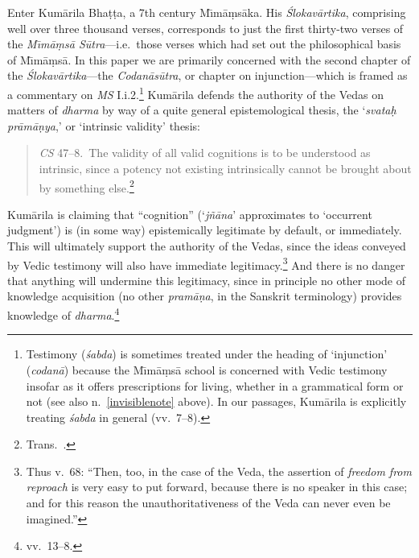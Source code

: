 \documentclass[11pt,letterpaper,oneside]{amsart}
\newcommand{\e}{\emph}
\newenvironment{squote}{\begin{quote}\sf\small}{\rm\end{quote}} %
\begin{document}
Enter Kum\=arila Bha\d t\d ta, a 7th century M\={\i}m\=a\d ms\=aka. His \emph{\small\'S\normalsize lokav\=artika}, comprising well over three thousand verses, corresponds to just the first thirty-two verses of the \emph{M\={\i}m\=a\d ms\=a S\=utra}---i.e.\ those verses which had set out the philosophical basis of M\={\i}m\=a\d ms\=a. In this paper we are primarily concerned with the second chapter of the \emph{\small\'S\normalsize lokav\=artika}---the \emph{Codan\=as\=utra}, or chapter on injunction---which is framed as a commentary on \emph{MS} I.i.2.\footnote{Testimony (\emph{\'sabda}) is sometimes treated under the heading of `injunction' (\emph{codan\=a}) because the M\={\i}m\=a\d ms\=a school is concerned with Vedic testimony insofar as it offers prescriptions for living, whether in a grammatical form or not (see also n.\ \ref{invisiblenote} above). In our passages, Kum\=arila is explicitly treating \emph{\'sabda} in general (vv.\ 7--8).} Kum\=arila defends the authority of the Vedas on matters of \emph{dharma} by way of a quite general epistemological thesis, the `\emph{svata\d h pr\=am\=a\d nya},' or `intrinsic validity' thesis:\begin{squote}\e{CS} 47--8.\ The validity of all valid cognitions is to be understood as intrinsic, since a potency not existing intrinsically cannot be brought about by something else.\footnote{Trans.\ \citet[p.\ 207]{taber1992dkb}.}\end{squote} Kum\=arila is claiming that ``cognition'' (`\emph{j\~n\=ana}' approximates to `occurrent judgment') is (in some way) epistemically legitimate by default, or immediately. This will ultimately support the authority of the Vedas, since the ideas conveyed by Vedic testimony will also have immediate legitimacy.\footnote{Thus v.\ 68: ``Then, too, in the case of the Veda, the assertion of \emph{freedom from reproach} is very easy to put forward, because there is no speaker in this case; and for this reason the unauthoritativeness of the Veda can never even be imagined.''} And there is no danger that anything will undermine this legitimacy, since in principle no other mode of knowledge acquisition (no other \emph{pram\=a\d na}, in the Sanskrit terminology) provides knowledge of \emph{dharma}.\footnote{vv.\ 13--8.}


\end{document}

